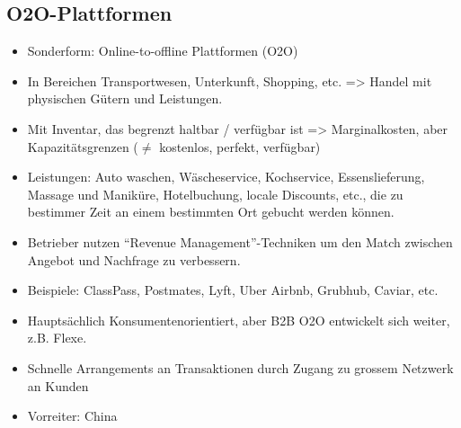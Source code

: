 \subsection{O2O-Plattformen}
\begin{itemize}
	\item Sonderform: Online-to-offline Plattformen (O2O)
	\item In Bereichen Transportwesen, Unterkunft, Shopping, etc. => Handel mit	physischen Gütern und Leistungen.
	\item Mit Inventar, das begrenzt haltbar / verfügbar ist => Marginalkosten, aber Kapazitätsgrenzen ($\neq$ kostenlos, perfekt, verfügbar)
	\item Leistungen: Auto waschen, Wäscheservice, Kochservice, Essenslieferung, Massage und Maniküre, Hotelbuchung, locale Discounts, etc., die zu bestimmer Zeit an einem bestimmten Ort gebucht werden können.
	\item Betrieber nutzen “Revenue Management”-Techniken um den Match zwischen Angebot und Nachfrage zu verbessern.
	\item Beispiele: ClassPass, Postmates, Lyft, Uber Airbnb, Grubhub, Caviar, etc.
	\item Hauptsächlich Konsumentenorientiert, aber B2B O2O entwickelt sich weiter, z.B. Flexe.
	\item Schnelle Arrangements an Transaktionen durch Zugang zu grossem Netzwerk an Kunden
	\item Vorreiter: China
\end{itemize}

